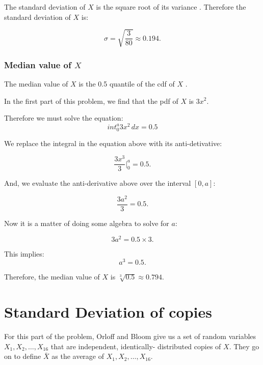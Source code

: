 \documentclass[a4paper,11pt]{article}
\begin{document}
The standard deviation of $X$ is the square root of its variance \cite{reading6a}.  Therefore the standard deviation of $X$ is:

\begin{equation}
\sigma=\sqrt{\frac{3}{80}} \approx
  0.194.
\end{equation}

\subsubsection{Median value of $X$}
The median value of $X$ is the 0.5
quantile of the cdf of $X$
\cite{reading6a}.

In the first part of this problem,
we find that the pdf of $X$ is
$3x^2$.

Therefore we must solve the equation:
\begin{equation}
int_0^a 3x^2 \,dx = 0.5
\end{equation}

We replace the integral in the
equation above with its
anti-detivative:

\begin{equation}
\frac{3x^3}{3} \bigg\rvert_0^a=0.5.
\end{equation}

And, we evaluate the anti-derivative
above over the interval $\left[0,a
\right]$:

\begin{equation}
\frac{3a^2}{3}=0.5.
\end{equation}

Now it is a matter of doing some
algebra to solve for $a$:

\begin{equation}
3a^2=0.5 \times 3.
\end{equation}

This implies:
\begin{equation}
a^3=0.5.
\end{equation}

Therefore, the median value of $X$ is
$\sqrt[3]{0.5} \approx 0.794$.

\section{Standard Deviation of
copies}

For this part of the problem, Orloff
and Bloom give us a set of
random variables $X_1, X_2, \ldots,
X_16$ that are independent, identically-
distributed copies of $X$.
They go on to define $\bar{X}$ as the
average of $X_1, X_2, \ldots, X_16$.
\end{document}
